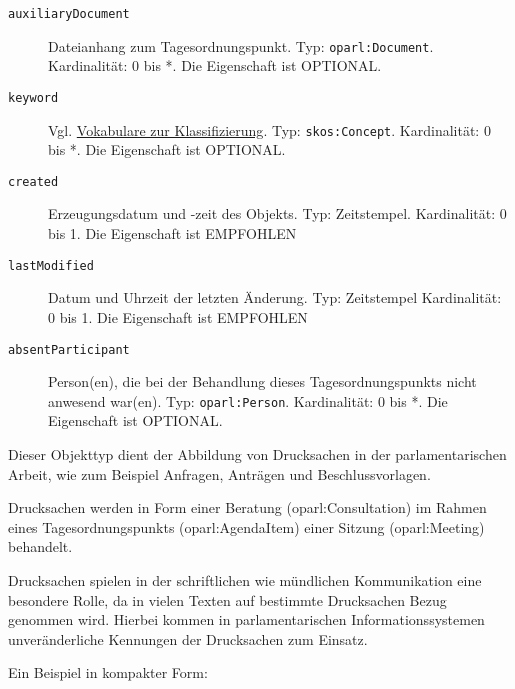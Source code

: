 \documentclass[,a4paper]{article}
\begin{document}
\begin{description}
\item[\texttt{auxiliaryDocument}]
Dateianhang zum Tagesordnungspunkt. Typ: \texttt{oparl:Document}.
Kardinalität: 0 bis *. Die Eigenschaft ist OPTIONAL.
\item[\texttt{keyword}]
Vgl. \hyperref[vokabulareux5fklassifizierung]{Vokabulare zur
Klassifizierung}. Typ: \texttt{skos:Concept}. Kardinalität: 0 bis *. Die
Eigenschaft ist OPTIONAL.
\item[\texttt{created}]
Erzeugungsdatum und -zeit des Objekts. Typ: Zeitstempel. Kardinalität: 0
bis 1. Die Eigenschaft ist EMPFOHLEN
\item[\texttt{lastModified}]
Datum und Uhrzeit der letzten Änderung. Typ: Zeitstempel Kardinalität: 0
bis 1. Die Eigenschaft ist EMPFOHLEN
\item[\texttt{absentParticipant}]
Person(en), die bei der Behandlung dieses Tagesordnungspunkts nicht
anwesend war(en). Typ: \texttt{oparl:Person}. Kardinalität: 0 bis *. Die
Eigenschaft ist OPTIONAL.
\end{description}


Dieser Objekttyp dient der Abbildung von Drucksachen in der
parlamentarischen Arbeit, wie zum Beispiel Anfragen, Anträgen und
Beschlussvorlagen.

Drucksachen werden in Form einer Beratung (oparl:Consultation) im Rahmen
eines Tagesordnungspunkts (oparl:AgendaItem) einer Sitzung
(oparl:Meeting) behandelt.

Drucksachen spielen in der schriftlichen wie mündlichen Kommunikation
eine besondere Rolle, da in vielen Texten auf bestimmte Drucksachen
Bezug genommen wird. Hierbei kommen in parlamentarischen
Informationssystemen unveränderliche Kennungen der Drucksachen zum
Einsatz.

Ein Beispiel in kompakter Form:
\end{document}
